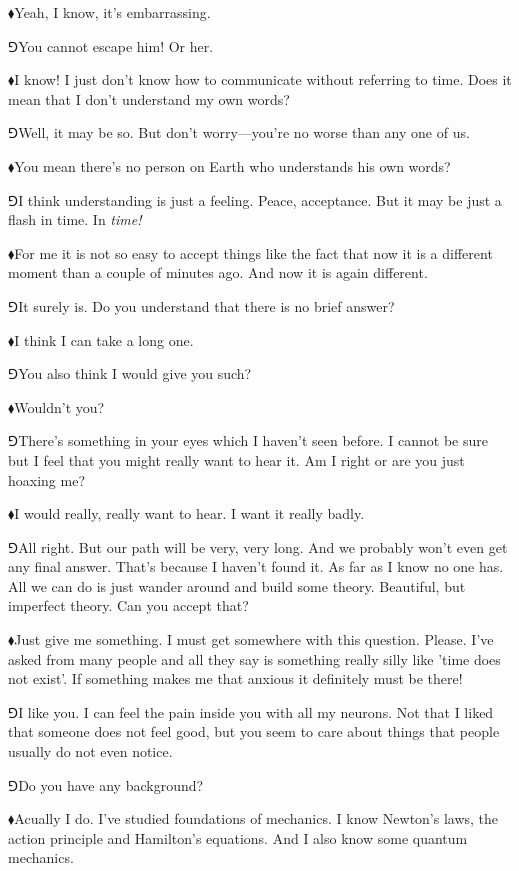 \documentclass[10pt,oneside%
]{memoir}
\newcommand{\hea}{\(\blacklozenge\)\;}
\newcommand{\heb}{\(\Game\)\;}
\begin{document}
\hea Yeah, I know, it's embarrassing.

\heb You cannot escape him! Or her.

\hea I know! I just don't know how to communicate without referring to time. Does it mean that I don't understand my own words?

\heb Well, it may be so. But don't worry---you're no worse than any one of us.

\hea You mean there's no person on Earth who understands his own words?

\heb I think understanding is just a feeling. Peace, acceptance. But it may be just a flash in time. In \emph{time!}

\hea For me it is not so easy to accept things like the fact that now it is a different moment than a couple of minutes ago. And now it is again different.

\heb It surely is. Do you understand that there is no brief answer?

\hea I think I can take a long one.

\heb You also think I would give you such?

\hea Wouldn't you?

\heb There's something in your eyes which I haven't seen before. I cannot be sure but I feel that you might really want to hear it. Am I right or are you just hoaxing me?

\hea I would really, really want to hear. I want it really badly.

\heb All right. But our path will be very, very long. And we probably won't even get any final answer. That's because I haven't found it. As far as I know no one has. All we can do is just wander around and build some theory. Beautiful, but imperfect theory. Can you accept that?

\hea Just give me something. I must get somewhere with this question. Please. I've asked from many people and all they say is something really silly like 'time does not exist'. If something makes me that anxious it definitely must be there!

\heb I like you. I can feel the pain inside you with all my neurons. Not that I liked that someone does not feel good, but you seem to care about things that people usually do not even notice.

\heb Do you have any background?

\hea Acually I do. I've studied foundations of mechanics. I know Newton's laws, the action principle and Hamilton's equations. And I also know some quantum mechanics.
\end{document}
